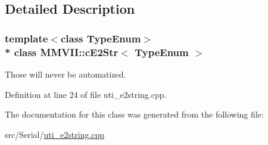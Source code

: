\subsection{Detailed Description}
\subsubsection*{template$<$class Type\+Enum$>$\\*
class M\+M\+V\+I\+I\+::c\+E2\+Str$<$ Type\+Enum $>$}

Those will never be automatized. 

Definition at line 24 of file uti\+\_\+e2string.\+cpp.



The documentation for this class was generated from the following file\+:\begin{DoxyCompactItemize}
\item 
src/\+Serial/\hyperlink{uti__e2string_8cpp}{uti\+\_\+e2string.\+cpp}\end{DoxyCompactItemize}
